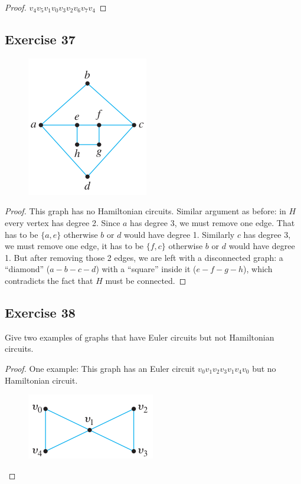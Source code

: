 \documentclass[14pt]{extarticle}
\begin{document}
\begin{proof}
\(v_4v_5v_1v_0v_3v_2v_6v_7v_4\)
\end{proof}

\subsection{Exercise 37}
\begin{figure}[ht!]
\centering
\includegraphics[scale=0.7]{../images/10.1.37.png}
\end{figure}

\begin{proof}
This graph has no Hamiltonian circuits. Similar argument as before: in \(H\) every vertex has degree 2. Since \(a\) has
degree 3, we must remove one edge. That has to be \(\{a,e\}\) otherwise \(b\) or \(d\) would have degree 1. Similarly \(c\)
has degree 3, we must remove one edge, it has to be \(\{f,c\}\) otherwise \(b\) or \(d\) would have degree 1. But after
removing those 2 edges, we are left with a disconnected graph: a ``diamond'' (\(a-b-c-d\)) with a ``square'' inside it 
(\(e-f-g-h\)), which contradicts the fact that \(H\) must be connected.
\end{proof}

\subsection{Exercise 38}
Give two examples of graphs that have Euler circuits but not Hamiltonian circuits.

\begin{proof}
One example: This graph has an Euler circuit \(v_0v_1v_2v_3v_1v_4v_0\) but no Hamiltonian circuit.

\begin{figure}[ht!]
\centering
\includegraphics[scale=0.5]{../images/10.1.38.png}
\end{figure}
\end{proof}
\end{document}
